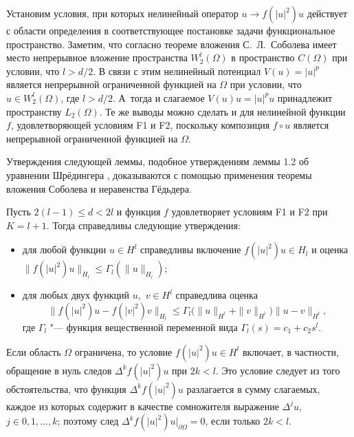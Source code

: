Установим условия, при которых нелинейный оператор $u\to f(|u|^2)u$ действует с области определения в соответствующее постановке задачи
функциональное пространство. Заметим, что согласно теореме вложения С.~Л.~Соболева имеет место непрерывное вложение
пространства $W^{l}_{2}(\Omega )$ в пространство $C(\Omega )$ при условии, что $l>d/2$. 
В связи с этим нелинейный потенциал $V(u)=|u|^{p}$ является непрерывной ограниченной функцией на $\Omega $ при условии, что $u\in W^{l}_{2}(\Omega )$, где $l>d/2$. 
А~тогда и слагаемое $V(u)u=|u|^{p}u$ принадлежит пространству $L_{2}(\Omega )$. 
Те же выводы можно сделать и для нелинейной функции $f$,
удовлетворяющей условиям {\sc F1} и {\sc F2}, поскольку композиция $f\circ u$ является непрерывной ограниченной функцией на $\Omega $.

Утверждения следующей леммы, подобное утверждениям леммы 1.2 об уравнении Шрёдингера
\cite[стр. 231]{Pazy},  доказываются с помощью применения теоремы вложения Соболева и неравенства Гёдьдера.

\begin{lemma}[3]Пусть $2(l-1)\leq d<2l$ и функция $f$ удовлетворяет условиям {\sc F1} и {\sc F2} при $K=l+1.$
Тогда справедливы следующие утверждения\/{\rm:}

\begin{itemize}
\item[{\rm 1)}] для любой функции $u\in H^{l}$ справедливы включение $f(|u|^{2})u\in H_{l}$ и оценка $\|f(|u|^{2}
)u\|_{H_{l}}\leq \Gamma _{l}(\|u\|_{H_{l}});$

\item[{\rm 2)}] для любых двух функций $u,$ $v\in H^{l}$ справедлива оценка 
$$\bigl\|f(|u|^2)u-f(|v|^2)v\bigr\|_{H_{l}}\leq
\Gamma _{l}\bigl(\|u\|_{H^{l}}+\|v\|_{H^l}\bigr)\|u-v\|_{H^l},$$ где $\Gamma _l$ "--- функция вещественной переменной вида $\Gamma _l(s)=c_1+c_2s^l.$

\end{itemize}
\end{lemma}

\smallskip

\begin{remark}[1] Если область $\Omega $ ограничена, то условие $f(|u|^2)u\in H^l$ включает, в частности, обращение в нуль следов $\Delta ^kf(|u|^2)u$ при $2k<l$. Это условие следует из того обстоятельства, что 
функция $\Delta ^kf(|u|^2)u$ разлагается в сумму слагаемых, каждое из которых содержит в качестве сомножителя выражение $\Delta ^ju,$ $ j\in 0, 1, \dots, k$; поэтому след $\Delta ^kf(|u|^2)u|_{\partial  \Omega }=0$, если только $2k<l$.
\end{remark}


